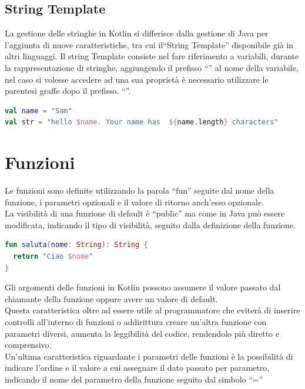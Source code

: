 \subsection{String Template}
La gestione delle stringhe in Kotlin si differisce dalla gestione di Java per l'aggiunta di nuove caratteristiche, tra cui il``String Template'' disponibile già in altri linguaggi.
Il string Template consiste nel fare riferimento a variabili, durante la rappresentazione di stringhe, aggiungendo il prefisso ``\textdollar'' al nome della variabile, nel caso si volesse accedere ad una sua proprietà è necessario utilizzare le parentesi graffe dopo il prefisso. ``\textdollar''.


\begin{lstlisting}[language=kotlin,caption={Esempio String template Kotlin}]
val name = "Sam"
val str = "hello $name. Your name has  ${name.length} characters"
\end{lstlisting}


\section{Funzioni}
Le funzioni sono definite utilizzando la parola ``fun'' seguite dal nome della funzione, i parametri opzionali e il valore di ritorno anch'esso opzionale.\\
La visibilità di una funzione di default è ``public'' ma come in Java può essere modificata, indicando il tipo di visibilità, seguito dalla definizione della funzione.

\begin{lstlisting}[language=Kotlin,caption={Esempio Funzione Kotlin}]
fun saluta(nome: String): String {
  return "Ciao $nome"
}
\end{lstlisting}

Gli argomenti delle funzioni in Kotlin possono assumere il valore passato dal chiamante della funzione oppure avere un valore di default.\\ Questa caratteristica oltre ad essere utile al programmatore che eviterà di inserire controlli all'interno di funzioni o addirittura creare un'altra funzione con parametri diversi, aumenta la leggibilità del codice, rendendolo più diretto e comprensivo.\\
Un'ultima caratteristica riguardante i parametri delle funzioni è la possibilità di indicare l'ordine e il valore a cui assegnare il dato passato per parametro, indicando il nome del parametro della funzione seguito dal simbolo ``=''

